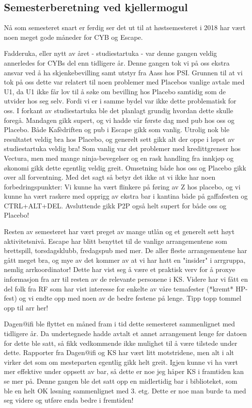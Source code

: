 \documentclass[10pt,norsk,a4paper]{article}
\begin{document}
\subsection{Semesterberetning ved kjellermogul}
\begin{multicols}{2}
Nå som semesteret snart er ferdig ser det ut til at høstsemesteret i 2018 har vært noen meget gode måneder for CYB og Escape.

Fadderuka, eller nytt av året - studiestartuka - var denne gangen veldig annerledes for CYBs del enn tidligere år.
Denne gangen tok vi på oss ekstra ansvar ved å ha skjenkebevilling samt utstyr fra Aass hos PSI.
Grunnen til at vi tok på oss dette var relatert til noen problemer med Placebos vanlige avtale med U1,
da U1 ikke får lov til å søke om bevilling hos Placebo samtidig som de utvider hos seg selv.
Fordi vi er i samme bydel var ikke dette problematisk for oss.
I forkant av studiestartuka ble det planlagt grundig hvordan dette skulle foregå.
Mandagen gikk supert, og vi hadde vår første dag med pub hos oss og Placebo.
Både Kafèdriften og pub i Escape gikk som vanlig.
Utrolig nok ble resultatet veldig bra hos Placebo, og generelt sett gikk alt der oppe i løpet av studiestartuka veldig bra!
Som vanlig var det problemer med kredittgrenser hos Vectura, men med mange ninja-bevegelser og en rask handling fra innkjøp og økonomi gikk dette egentlig veldig greit.
Omsetning både hos oss og Placebo gikk over all forventning.
Med det sagt så betyr det ikke at vi ikke har noen forbedringspunkter:
Vi kunne ha vært flinkere på føring av Z hos placebo, og vi kunne ha vært raskere med opprigg av ekstra bar i kantina både på gaffafesten og CTRL+ALT+DEL.
Avsluttende gikk P2P også helt supert for både oss og Placebo!

Resten av semesteret har vært preget av mange utlån og et generelt sett høyt aktivitetsnivå.
Escape har blitt benyttet til de vanlige arrangementene som brettspill, torsdagsklubb, fredagspub med mer.
De aller fleste arrangementene har gått meget bra, og mye av det kommer av at vi har hatt en "insider" i arrgruppa, nemlig arrkoordinator!
Dette har vist seg å være et praktisk verv for å proxye informasjon fra arr til resten av de relevante personene i KS.
Videre har vi fått en del folk fra RF som har vist interesse for enkelte av våre temafester (*kremt* HP-fest) og vi endte opp med noen av de bedre festene på lenge.
Tipp topp tommel opp til arr her!

Dagen@ifi ble flyttet en måned fram i tid dette semesteret sammenlignet med tidligere år.
Da undertegnede hadde avtalt et annet arrangement lenge før datoen for dette ble satt, så fikk vedkommende ikke mulighet til å være tilstede under dette.
Rapporter fra Dagen@ifi og KS har vært litt motstridene, men alt i alt virker det som om mesteparten egentlig gikk helt greit.
Igjen kunne vi ha vært mer effektive under oppsett av bar, så dette er noe jeg håper KS i framtiden kan se mer på.
Denne gangen ble det satt opp en midlertidig bar i biblioteket, som ble en helt OK løsning sammenlignet med 3. etg.
Dette er noe man burde ta med seg videre og utføre enda bedre i fremtiden!


\end{multicols}
\end{document}
